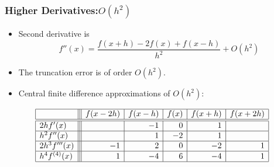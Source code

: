 \documentclass{beamer}
\begin{document}
\begin{frame}[fragile]
\frametitle{Higher Derivatives:$O(h^2)$}

\begin{itemize}
\item Second derivative is 
\[
f''(x)=\frac{f(x+h)-2f(x)+f(x-h)}{h^2}+O(h^2)
\]
\item The truncation error is of order $O(h^2)$.
\item Central finite difference approximations of $O(h^2)$:
\end{itemize}
\[
\begin{array}{|l|||r|r|r|r|r|}
  \hline & f(x-2 h) & f(x-h) & f(x) & f(x+h) & f(x+2 h) \\
  \hline \hline 2 h f^{\prime}(x) & & -1 & 0 & 1 & \\
  \hline h^2 f^{\prime \prime}(x) & & 1 & -2 & 1 & \\
  \hline 2 h^3 f^{\prime \prime \prime}(x) & -1 & 2 & 0 & -2 & 1 \\
  \hline h^4 f^{(4)}(x) & 1 & -4 & 6 & -4 & 1 \\
  \hline
\end{array}
\]
\end{frame}
\end{document}
